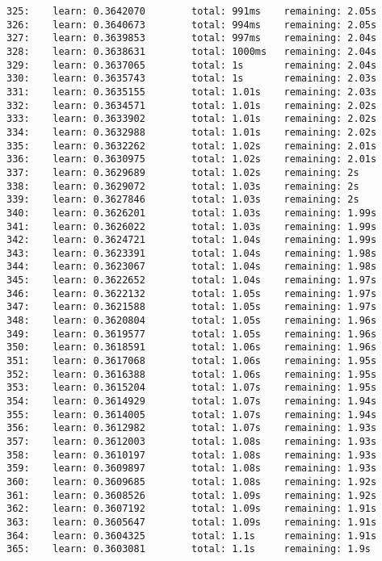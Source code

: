 \documentclass[11pt]{article}
\begin{document}
\begin{Verbatim}[commandchars=\\\{\}]
325:    learn: 0.3642070        total: 991ms    remaining: 2.05s
326:    learn: 0.3640673        total: 994ms    remaining: 2.05s
327:    learn: 0.3639853        total: 997ms    remaining: 2.04s
328:    learn: 0.3638631        total: 1000ms   remaining: 2.04s
329:    learn: 0.3637065        total: 1s       remaining: 2.04s
330:    learn: 0.3635743        total: 1s       remaining: 2.03s
331:    learn: 0.3635155        total: 1.01s    remaining: 2.03s
332:    learn: 0.3634571        total: 1.01s    remaining: 2.02s
333:    learn: 0.3633902        total: 1.01s    remaining: 2.02s
334:    learn: 0.3632988        total: 1.01s    remaining: 2.02s
335:    learn: 0.3632262        total: 1.02s    remaining: 2.01s
336:    learn: 0.3630975        total: 1.02s    remaining: 2.01s
337:    learn: 0.3629689        total: 1.02s    remaining: 2s
338:    learn: 0.3629072        total: 1.03s    remaining: 2s
339:    learn: 0.3627846        total: 1.03s    remaining: 2s
340:    learn: 0.3626201        total: 1.03s    remaining: 1.99s
341:    learn: 0.3626022        total: 1.03s    remaining: 1.99s
342:    learn: 0.3624721        total: 1.04s    remaining: 1.99s
343:    learn: 0.3623391        total: 1.04s    remaining: 1.98s
344:    learn: 0.3623067        total: 1.04s    remaining: 1.98s
345:    learn: 0.3622652        total: 1.04s    remaining: 1.97s
346:    learn: 0.3622132        total: 1.05s    remaining: 1.97s
347:    learn: 0.3621588        total: 1.05s    remaining: 1.97s
348:    learn: 0.3620804        total: 1.05s    remaining: 1.96s
349:    learn: 0.3619577        total: 1.05s    remaining: 1.96s
350:    learn: 0.3618591        total: 1.06s    remaining: 1.96s
351:    learn: 0.3617068        total: 1.06s    remaining: 1.95s
352:    learn: 0.3616388        total: 1.06s    remaining: 1.95s
353:    learn: 0.3615204        total: 1.07s    remaining: 1.95s
354:    learn: 0.3614929        total: 1.07s    remaining: 1.94s
355:    learn: 0.3614005        total: 1.07s    remaining: 1.94s
356:    learn: 0.3612982        total: 1.07s    remaining: 1.93s
357:    learn: 0.3612003        total: 1.08s    remaining: 1.93s
358:    learn: 0.3610197        total: 1.08s    remaining: 1.93s
359:    learn: 0.3609897        total: 1.08s    remaining: 1.93s
360:    learn: 0.3609685        total: 1.08s    remaining: 1.92s
361:    learn: 0.3608526        total: 1.09s    remaining: 1.92s
362:    learn: 0.3607192        total: 1.09s    remaining: 1.91s
363:    learn: 0.3605647        total: 1.09s    remaining: 1.91s
364:    learn: 0.3604325        total: 1.1s     remaining: 1.91s
365:    learn: 0.3603081        total: 1.1s     remaining: 1.9s

\end{Verbatim}
\end{document}
